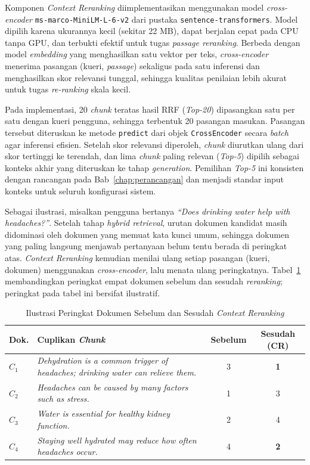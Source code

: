 Komponen \textit{Context Reranking} diimplementasikan menggunakan model \textit{cross-encoder} \texttt{ms-marco-MiniLM-L-6-v2} dari pustaka \texttt{sentence-transformers}. Model dipilih karena ukurannya kecil (sekitar 22 MB), dapat berjalan cepat pada CPU tanpa GPU, dan terbukti efektif untuk tugas \textit{passage reranking}. Berbeda dengan model \textit{embedding} yang menghasilkan satu vektor per teks, \textit{cross-encoder} menerima pasangan (kueri, \textit{passage}) sekaligus pada satu inferensi dan menghasilkan skor relevansi tunggal, sehingga kualitas penilaian lebih akurat untuk tugas \textit{re-ranking} skala kecil.

Pada implementasi, 20 \textit{chunk} teratas hasil RRF (\textit{Top-20}) dipasangkan satu per satu dengan kueri pengguna, sehingga terbentuk 20 pasangan masukan. Pasangan tersebut diteruskan ke metode \texttt{predict} dari objek \texttt{CrossEncoder} secara \textit{batch} agar inferensi efisien. Setelah skor relevansi diperoleh, \textit{chunk} diurutkan ulang dari skor tertinggi ke terendah, dan lima \textit{chunk} paling relevan (\textit{Top-5}) dipilih sebagai konteks akhir yang diteruskan ke tahap \textit{generation}. Pemilihan \textit{Top-5} ini konsisten dengan rancangan pada Bab~\ref{chap:perancangan} dan menjadi standar input konteks untuk seluruh konfigurasi sistem.

Sebagai ilustrasi, misalkan pengguna bertanya \textit{``Does drinking water help with headaches?''}. Setelah tahap \textit{hybrid retrieval}, urutan dokumen kandidat masih didominasi oleh dokumen yang memuat kata kunci umum, sehingga dokumen yang paling langsung menjawab pertanyaan belum tentu berada di peringkat atas. \textit{Context Reranking} kemudian menilai ulang setiap pasangan (kueri, dokumen) menggunakan \textit{cross-encoder}, lalu menata ulang peringkatnya. Tabel~\ref{tbl:cr-contoh} membandingkan peringkat empat dokumen sebelum dan sesudah \textit{reranking}; peringkat pada tabel ini bersifat ilustratif.

\begin{table}[H]
\centering
\footnotesize
\setlength{\tabcolsep}{5pt}
\caption{Ilustrasi Peringkat Dokumen Sebelum dan Sesudah \textit{Context Reranking}}
\label{tbl:cr-contoh}
\begin{tabular}{p{0.8cm} p{7.4cm} c c}
\toprule
\textbf{Dok.} & \textbf{Cuplikan \textit{Chunk}} & \textbf{Sebelum} & \textbf{Sesudah (CR)} \\
\midrule
$C_1$ & \textit{Dehydration is a common trigger of headaches; drinking water can relieve them.} & 3 & \textbf{1} \\
\addlinespace
$C_2$ & \textit{Headaches can be caused by many factors such as stress.} & 1 & 3 \\
\addlinespace
$C_3$ & \textit{Water is essential for healthy kidney function.} & 2 & 4 \\
\addlinespace
$C_4$ & \textit{Staying well hydrated may reduce how often headaches occur.} & 4 & \textbf{2} \\
\bottomrule
\end{tabular}
\end{table}

